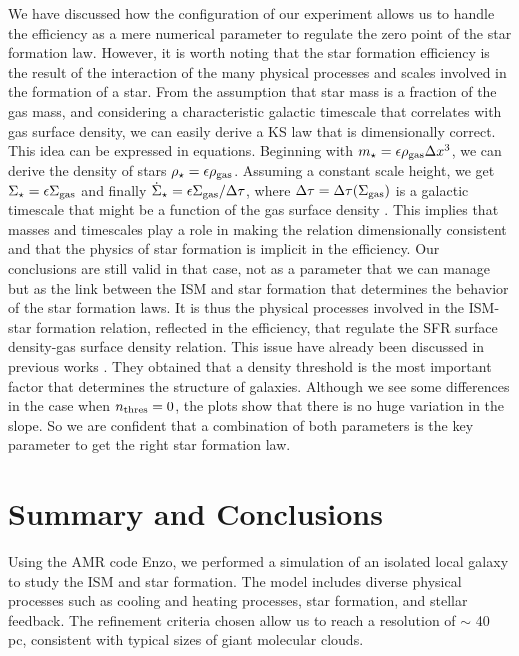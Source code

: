 \documentclass[twocolumn]{aastex}
\newcommand{\mstar}{m_\star}
\newcommand{\rhostar}{\rho_\star}
\newcommand{\rhogas}{\rho_{\rm gas}}
\newcommand{\sstar}{\Sigma_\star}
\newcommand{\sstardot}{\dot{\Sigma}_\star}
\newcommand{\sgas}{\Sigma_{\rm gas}}
\begin{document}
We have discussed how the configuration of our experiment allows us to handle the efficiency as a mere numerical parameter to regulate the zero point of the star formation law. However, it is worth noting that the star formation efficiency is the result of the interaction of the many physical processes and scales involved in the formation of a star. From the assumption that star mass is a fraction of the gas mass, and considering a characteristic galactic timescale that correlates with gas surface density, we can easily derive a KS law that is dimensionally correct. This idea can be expressed in equations. Beginning with $\mstar=\epsilon\rhogas\Delta x^3$, we can derive the density of stars $\rhostar=\epsilon\rhogas$. Assuming a constant scale height, we get $\sstar=\epsilon\sgas$ and finally $\sstardot=\epsilon \sgas /\Delta \tau$, where $\Delta \tau = \Delta \tau (\sgas)$ is a galactic timescale that might be a function of the gas surface density . This implies that masses and timescales play a role in making the relation dimensionally consistent and that the physics of star formation is implicit in the efficiency. Our conclusions are still valid in that case, not as a parameter that we can manage but as the link between the ISM and star formation that determines the behavior of the star formation laws. It is thus the physical processes involved in the ISM-star formation relation, reflected in the efficiency, that regulate the SFR surface density-gas surface density relation. This issue have already been discussed in previous works \citep{Saitoh_08}. They obtained that a density threshold is the most important factor that determines the structure of galaxies. Although we see some differences in the case when $n_{\rm thres} = 0$, the plots show that there is no huge variation in the slope. So we are confident that a combination of both parameters is the key parameter to get the right star formation law.

\section{Summary and Conclusions}
\label{sec:conclusions}

Using the AMR code Enzo, we performed a simulation of an isolated local galaxy to study the ISM and star formation. The model includes diverse physical processes such as cooling and heating processes, star formation, and stellar feedback. The refinement criteria chosen allow us to reach a resolution of $\sim$ 40 pc, consistent with typical sizes of giant molecular clouds.
\end{document}

